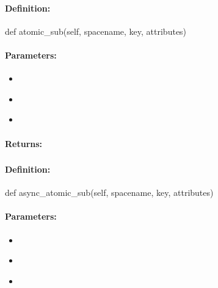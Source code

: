 \paragraph{Definition:}
\begin{pythoncode}
def atomic_sub(self, spacename, key, attributes)
\end{pythoncode}

\paragraph{Parameters:}
\begin{itemize}[noitemsep]
\item {}\\

\item {}\\

\item {}\\

\end{itemize}

\paragraph{Returns:}


\pagebreak
\subsubsection{}
\label{api:python:async_atomic_sub}


\paragraph{Definition:}
\begin{pythoncode}
def async_atomic_sub(self, spacename, key, attributes)
\end{pythoncode}

\paragraph{Parameters:}
\begin{itemize}[noitemsep]
\item {}\\

\item {}\\

\item {}\\

\end{itemize}

